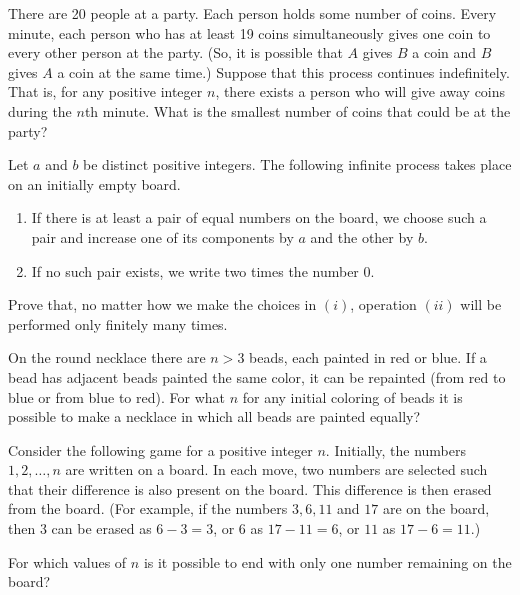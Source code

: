\begin{problem}[ELMOSL 2013]
    There are 20 people at a party. Each person holds some number of coins. Every minute, each person who has at least 19 coins simultaneously gives one coin to every other person at the party. (So, it is possible that $A$ gives $B$ a coin and $B$ gives $A$ a coin at the same time.) Suppose that this process continues indefinitely. That is, for any positive integer $n$, there exists a person who will give away coins during the $n$th minute. What is the smallest number of coins that could be at the party?
\end{problem}

\begin{problem}[ISL 2018]
    Let $a$ and $b$ be distinct positive integers. The following infinite process takes place on an initially empty board.
    \begin{enumerate}
        \item If there is at least a pair of equal numbers on the board, we choose such a pair and increase one of its components by $a$ and the other by $b$.
        \item If no such pair exists, we write two times the number $0$.   
    \end{enumerate}
    Prove that, no matter how we make the choices in $(i)$, operation $(ii)$ will be performed only finitely many times.

\end{problem}
\begin{problem} 
On the round necklace there are $n> 3$ beads, each painted in red or blue. If a bead has adjacent beads painted the same color, it can be repainted (from red to blue or from blue to red). For what $n$ for any initial coloring of beads it is possible to make a necklace in which all beads are painted equally?
\end{problem}
\begin{problem} [Austria 2025]
Consider the following game for a positive integer $n$. Initially, the numbers $1, 2, \ldots, n$ are written on a board. In each move, two numbers are selected such that their difference is also present on the board. This difference is then erased from the board. (For example, if the numbers $3,6,11$ and $17$ are on the board, then $3$ can be erased as $6 - 3=3$, or $6$ as $17 - 11=6$, or $11$ as $17 - 6=11$.)

For which values of $n$ is it possible to end with only one number remaining on the board?
\end{problem}
